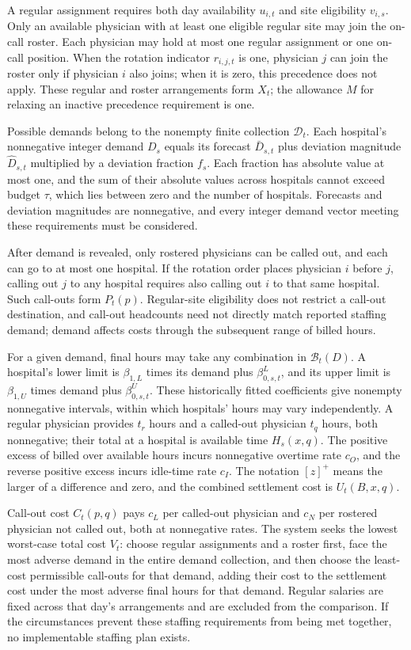 \documentclass[10pt]{article}
\begin{document}
A regular assignment requires both day availability $u_{i,t}$ and site eligibility $v_{i,s}$. Only an available physician with at least one eligible regular site may join the on-call roster. Each physician may hold at most one regular assignment or one on-call position. When the rotation indicator $r_{i,j,t}$ is one, physician $j$ can join the roster only if physician $i$ also joins; when it is zero, this precedence does not apply. These regular and roster arrangements form $X_t$; the allowance $M$ for relaxing an inactive precedence requirement is one.

Possible demands belong to the nonempty finite collection $\mathcal D_t$. Each hospital's nonnegative integer demand $D_s$ equals its forecast $\bar D_{s,t}$ plus deviation magnitude $\widehat D_{s,t}$ multiplied by a deviation fraction $f_s$. Each fraction has absolute value at most one, and the sum of their absolute values across hospitals cannot exceed budget $\tau$, which lies between zero and the number of hospitals. Forecasts and deviation magnitudes are nonnegative, and every integer demand vector meeting these requirements must be considered.

After demand is revealed, only rostered physicians can be called out, and each can go to at most one hospital. If the rotation order places physician $i$ before $j$, calling out $j$ to any hospital requires also calling out $i$ to that same hospital. Such call-outs form $P_t(p)$. Regular-site eligibility does not restrict a call-out destination, and call-out headcounts need not directly match reported staffing demand; demand affects costs through the subsequent range of billed hours.

For a given demand, final hours may take any combination in $\mathcal B_t(D)$. A hospital's lower limit is $\beta_{1,L}$ times its demand plus $\beta_{0,s,t}^{L}$, and its upper limit is $\beta_{1,U}$ times demand plus $\beta_{0,s,t}^{U}$. These historically fitted coefficients give nonempty nonnegative intervals, within which hospitals' hours may vary independently. A regular physician provides $t_r$ hours and a called-out physician $t_q$ hours, both nonnegative; their total at a hospital is available time $H_s(x,q)$. The positive excess of billed over available hours incurs nonnegative overtime rate $c_O$, and the reverse positive excess incurs idle-time rate $c_I$. The notation $[z]^+$ means the larger of a difference and zero, and the combined settlement cost is $U_t(B,x,q)$.

Call-out cost $C_t(p,q)$ pays $c_L$ per called-out physician and $c_N$ per rostered physician not called out, both at nonnegative rates. The system seeks the lowest worst-case total cost $V_t$: choose regular assignments and a roster first, face the most adverse demand in the entire demand collection, and then choose the least-cost permissible call-outs for that demand, adding their cost to the settlement cost under the most adverse final hours for that demand. Regular salaries are fixed across that day's arrangements and are excluded from the comparison. If the circumstances prevent these staffing requirements from being met together, no implementable staffing plan exists.
\end{document}
